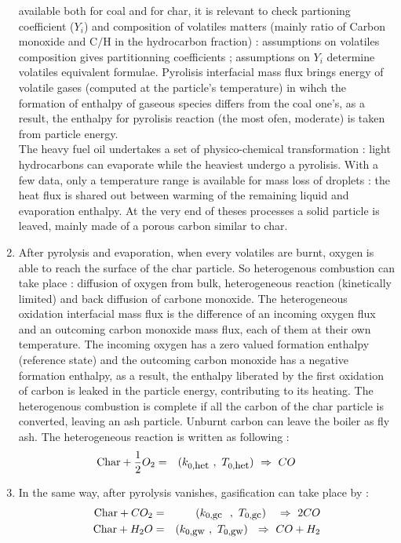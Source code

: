 \begin{enumerate}
available both for coal and for char, it is relevant to check partioning
coefficient ($Y_{i}$) and composition of volatiles matters (mainly ratio of
Carbon monoxide and C$/$H in the hydrocarbon fraction) : assumptions on
volatiles composition gives partitionning coefficients ; assumptions on $Y_{i}$
determine volatiles equivalent formulae. Pyrolisis interfacial mass flux brings
energy of volatile gases (computed at the particle's temperature) in wihch the
formation of enthalpy of gaseous species differs from the coal one's, as a
result, the enthalpy for pyrolisis reaction (the most ofen, moderate) is taken
from particle energy.\\
The heavy fuel oil undertakes a set of physico-chemical transformation : light
hydrocarbons can evaporate while the heaviest undergo a pyrolisis. With a few
data, only a temperature range is available for mass loss of droplets : the heat
flux is shared out between warming of the remaining liquid and evaporation
enthalpy. At the very end of theses processes a solid particle is leaved, mainly
made of a porous carbon similar to char.
\item After pyrolysis and evaporation, when every volatiles are burnt, oxygen is
  able to reach the surface of the char particle. So heterogenous combustion can
  take place : diffusion of oxygen from bulk, heterogeneous reaction
  (kinetically limited) and back diffusion of carbone monoxide. The
  heterogeneous oxidation interfacial mass flux is the difference of an incoming
  oxygen flux and an outcoming carbon monoxide mass flux, each of them at their
  own temperature. The incoming oxygen has a zero valued formation enthalpy
  (reference state) and the outcoming carbon monoxide has a negative formation
  enthalpy, as a result, the enthalpy liberated by the first oxidation of carbon
  is leaked in the particle energy, contributing to its heating. The
  heterogenous combustion is complete if all the carbon of the char particle is
  converted, leaving an ash particle. Unburnt carbon can leave the boiler as fly
  ash. The heterogeneous reaction is written as following :
\begin{eqnarray}
\mbox{Char} + \displaystyle \frac{1}{2} O_{2} &=& (k_{0,\mbox{\small het}}~,~ T_{0,\mbox{\small het}}) ~\Rightarrow~ CO \qquad
\end{eqnarray}
\item In the same way, after pyrolysis vanishes, gasification can take place by :
\begin{eqnarray}
\mbox{Char} +  CO_{2} &=&(k_{0,\mbox{\small gc}}~~,~ T_{0,\mbox{\small gc}})~~~\Rightarrow~ 2 CO                 \\
\mbox{Char} +  H_{2}O &=&(k_{0,\mbox{\small gw}}~,~ T_{0,\mbox{\small gw}})  ~~\Rightarrow~ CO + H_{2}
\end{eqnarray} 
\end{enumerate}

